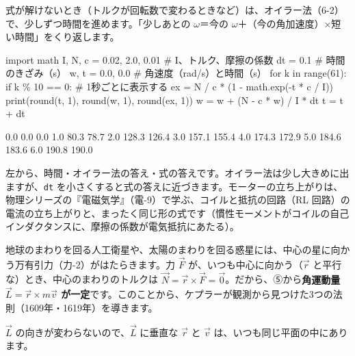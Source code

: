 式が解けないとき（トルクが回転数で変わるときなど）は、オイラー法（6-2）で、少しずつ時間を進めます。「少しあとの $\omega$＝今の $\omega$＋（今の角加速度）×短い時間」をくり返します。
\begin{phcode}
import math
I, N, c = 0.02, 2.0, 0.01     \# I、トルク、摩擦の係数
dt = 0.1                      \# 時間のきざみ（s）
w, t = 0.0, 0.0               \# 角速度（rad/s）と時間（s）
for k in range(61):
    if k \% 10 == 0:           \# 1秒ごとに表示する
        ex = N / c * (1 - math.exp(-t * c / I))
        print(round(t, 1), round(w, 1), round(ex, 1))
    w = w + (N - c * w) / I * dt
    t = t + dt
\end{phcode}
\begin{phcodeout}
0.0 0.0 0.0
1.0 80.3 78.7
2.0 128.3 126.4
3.0 157.1 155.4
4.0 174.3 172.9
5.0 184.6 183.6
6.0 190.8 190.0
\end{phcodeout}
左から、時間・オイラー法の答え・式の答えです。オイラー法は少し大きめに出ますが、\texttt{dt} を小さくすると式の答えに近づきます。モーターの立ち上がりは、物理シリーズの『電磁気学』（電-9）で学ぶ、コイルと抵抗の回路（RL 回路）の電流の立ち上がりと、まったく同じ形の式です（慣性モーメントがコイルの自己インダクタンスに、摩擦の係数が電気抵抗にあたる）。


\leavevmode\label{ph:力-6:sec10}地球のまわりを回る人工衛星や、太陽のまわりを回る惑星には、中心の星に向かう万有引力（力-2）がはたらきます。力 $\vec F$ が、いつも中心に向かう（$\vec r$ と平行な）とき、中心のまわりのトルクは $\vec N=\vec r\times\vec F=\vec 0$。だから、⑤から\textbf{角運動量 $\vec L=\vec r\times m\vec v$ が一定}です。このことから、ケプラーが観測から見つけた3つの法則（1609年・1619年）を導きます。

$\vec L$ の向きが変わらないので、$\vec L$ に垂直な $\vec r$ と $\vec v$ は、いつも同じ平面の中にあります。

